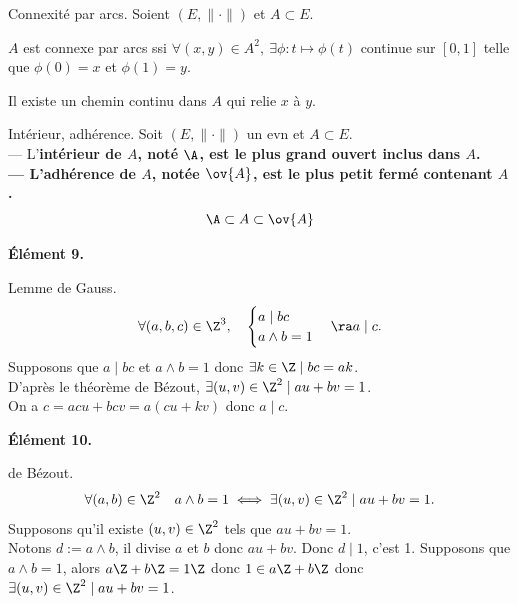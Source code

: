 \documentclass[11pt]{article}
\begin{document}
\begin{defi}{Connexité par arcs.}{}
    Soient $(E,\|\cdot\|)$ et $A\subset E$.
    \begin{center}
        $A$ est connexe par arcs ssi $\forall(x,y)\in A^2, ~ \exists \phi : t \mapsto \phi(t)$ continue sur $[0,1]$ telle que $\phi(0)=x$ et $\phi(1)=y$.
    \end{center}
    Il existe un chemin continu dans $A$ qui relie $x$ à $y$.
\end{defi}

\begin{defi}{Intérieur, adhérence.}{}
    Soit $(E,\|\cdot\|)$ un evn et $A\subset E$.\\
    --- L'\bf{intérieur} de $A$, noté $\A$, est le plus grand ouvert inclus dans $A$.\\
    --- L'\bf{adhérence} de $A$, notée $\ov{A}$, est le plus petit fermé contenant $A$.
    \begin{equation*}
        \A\subset A \subset \ov{A}
    \end{equation*}
\end{defi}

\begin{center}
    \bf{Élément 9.}
\end{center}

\begin{thm}{Lemme de Gauss.}{}
    \begin{equation*}
        \forall(a,b,c)\in\Z^3,\quad\begin{cases}
            a\mid bc\\
            a\land b = 1
        \end{cases}\ra a \mid c.
    \end{equation*}
    \tcblower
    Supposons que $a\mid bc$ et $a\land b=1$ donc $\exists k \in \Z \mid bc = ak$.\\
    D'après le théorème de Bézout, $\exists (u,v)\in\Z^2\mid au+bv=1$.\\
    On a $c=acu+bcv=a(cu+kv)$ donc $a\mid c$.
\end{thm}

\begin{center}
    \bf{Élément 10.}
\end{center}

\begin{thm}{de Bézout.}{}
    \begin{equation*}
        \forall(a,b)\in\Z^2\quad a\land b = 1 \iff \exists(u,v)\in\Z^2\mid au+bv=1.
    \end{equation*}
    \tcblower
    \fbox{$\Leftarrow$} Supposons qu'il existe $(u,v)\in\Z^2$ tels que $au+bv=1$.\\
    Notons $d:=a\land b$, il divise $a$ et $b$ donc $au+bv$. Donc $d\mid 1$, c'est 1.\n
    \fbox{$\Rightarrow$} Supposons que $a\land b = 1$, alors $a\Z+b\Z=1\Z$ donc $1\in a\Z+b\Z$ donc $\exists (u,v)\in\Z^2\mid au+bv=1$.
\end{thm}
\end{document}
